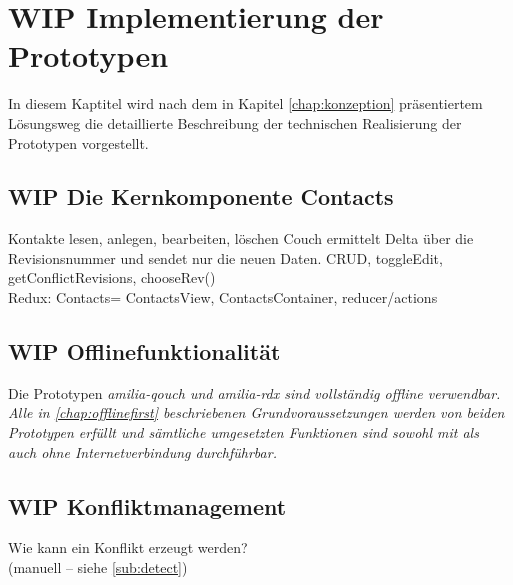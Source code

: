 \chapter{\label{chap:implementierung}WIP Implementierung der Prototypen}
In diesem Kaptitel wird nach dem in Kapitel \ref{chap:konzeption} präsentiertem Lösungsweg die detaillierte Beschreibung der technischen Realisierung der Prototypen vorgestellt.\\
%
%
%
\section{WIP Die Kernkomponente Contacts}

Kontakte lesen, anlegen, bearbeiten, löschen
Couch ermittelt Delta über die Revisionsnummer und sendet nur die neuen Daten.
CRUD, toggleEdit, getConflictRevisions, chooseRev()\\
Redux: Contacts= ContactsView, ContactsContainer, reducer/actions
%
%
%
\section{WIP Offlinefunktionalität}
Die Prototypen \it{amilia-qouch} und \it{amilia-rdx} sind vollständig offline verwendbar.
Alle in \autoref{chap:offlinefirst} beschriebenen Grundvoraussetzungen werden von beiden Prototypen erfüllt und sämtliche umgesetzten Funktionen sind sowohl mit als auch ohne Internetverbindung durchführbar.
%

%
%
%
\section{WIP Konfliktmanagement}
Wie kann ein Konflikt erzeugt werden?\\
(manuell -- siehe \ref{sub:detect})
\begin{center}
  
\end{center}

\begin{center}
  
\end{center}

